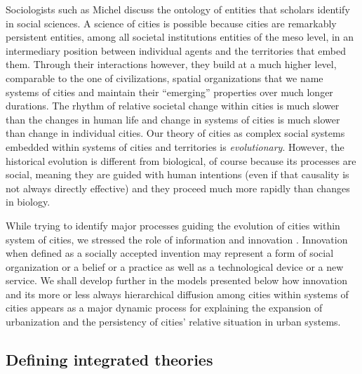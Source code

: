 \documentclass[10pt,letterpaper]{article}
\begin{document}
Sociologists such as Michel \cite{grossetti2020matiere} discuss the ontology of entities that scholars identify in social sciences. A science of cities is possible because cities are remarkably persistent entities, among all societal institutions entities of the meso level, in an intermediary position between individual agents and the territories that embed them. Through their interactions however, they build at a much higher level, comparable to the one of civilizations, spatial organizations that we name systems of cities and maintain their ``emerging'' properties over much longer durations. The rhythm of relative societal change within cities is much slower than the changes in human life and change in systems of cities is much slower than change in individual cities. Our theory of cities as complex social systems embedded within systems of cities and territories is \emph{evolutionary}. However, the historical evolution is different from biological, of course because its processes are social, meaning they are guided with human intentions (even if that causality is not always directly effective) and they proceed much more rapidly than changes in biology.

While trying to identify major processes guiding the evolution of cities within system of cities, we stressed the role of information and innovation \citep{lane2009complexity}. Innovation when defined as a socially accepted invention may represent a form of social organization or a belief or a practice as well as a technological device or a new service. We shall develop further in the models presented below how innovation and its more or less always hierarchical diffusion among cities within systems of cities appears as a major dynamic process for explaining the expansion of urbanization and the persistency of cities’ relative situation in urban systems.


\subsection{Defining integrated theories}
\end{document}
